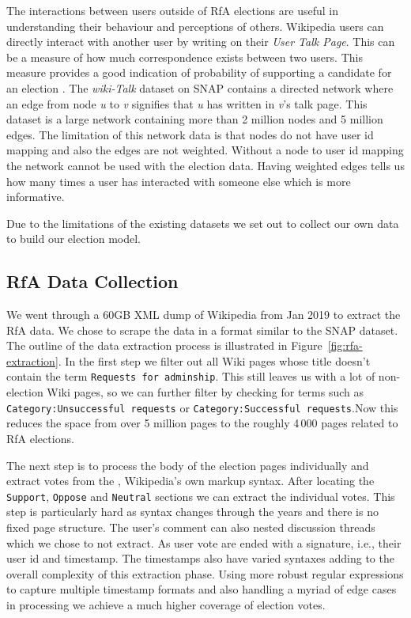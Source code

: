 The interactions between users outside of RfA elections are useful in understanding their behaviour and perceptions of others. Wikipedia users can directly interact with another user by writing on their \textit{User Talk Page}. This can be a measure of how much correspondence exists between two users. This measure provides a good indication of probability of supporting a candidate for an election \cite{leskovec2010governance}. The \textit{wiki-Talk} dataset on SNAP contains a directed network where an edge from node \textit{u} to \textit{v} signifies that \textit{u} has written in \textit{v}'s talk page. This dataset is a large network containing more than 2 million nodes and 5 million edges. The limitation of this network data is that nodes do not have user id mapping and also the edges are not weighted. Without a node to user id mapping the network cannot be used with the election data. Having weighted edges tells us how many times a user has interacted with someone else which is more informative. 
\smallskip

Due to the limitations of the existing datasets we set out to collect our own data to build our election model.

\subsection{RfA Data Collection}

We went through a 60GB XML dump of Wikipedia from Jan 2019 to extract the RfA data. We chose to scrape the data in a format similar to the SNAP \wikirfa dataset. The outline of the data extraction process is illustrated in Figure~\ref{fig:rfa-extraction}. In the first step we filter out all Wiki pages whose title doesn't contain the term \texttt{Requests for adminship}. This still leaves us with a lot of non-election Wiki pages, so we can further filter by checking for terms such as \texttt{Category:Unsuccessful requests} or \texttt{Category:Successful requests}.Now this reduces the space from over 5 million pages to the roughly 4\,000 pages related to RfA elections.

The next step is to process the body of the election pages individually and extract votes from the \wikitalk, Wikipedia's own markup syntax. After locating the \texttt{Support}, \texttt{Oppose} and \texttt{Neutral} sections we can extract the individual votes. This step is particularly hard as \wikitalk syntax changes through the years and there is no fixed page structure. The user's comment can also nested discussion threads which we chose to not extract. As user vote are ended with a signature, i.e., their user id and timestamp. The timestamps also have varied syntaxes adding to the overall complexity of this extraction phase. Using more robust regular expressions to capture multiple timestamp formats and also handling a myriad of edge cases in processing we achieve a much higher coverage of election votes. 

